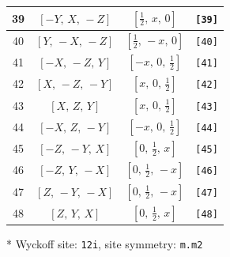 \documentclass[fleqn,8pt]{jsarticle}
\begin{document}
\begin{longtable}{cccc}
39 & $\left[ - Y,\, X,\, - Z \right]$ & $\left[ \frac{1}{2},\, x,\, 0 \right]$ & {\tt [39]} \\ \hline
40 & $\left[ Y,\, - X,\, - Z \right]$ & $\left[ \frac{1}{2},\, - x,\, 0 \right]$ & {\tt [40]} \\ \hline
41 & $\left[ - X,\, - Z,\, Y \right]$ & $\left[ - x,\, 0,\, \frac{1}{2} \right]$ & {\tt [41]} \\ \hline
42 & $\left[ X,\, - Z,\, - Y \right]$ & $\left[ x,\, 0,\, \frac{1}{2} \right]$ & {\tt [42]} \\ \hline
43 & $\left[ X,\, Z,\, Y \right]$ & $\left[ x,\, 0,\, \frac{1}{2} \right]$ & {\tt [43]} \\ \hline
44 & $\left[ - X,\, Z,\, - Y \right]$ & $\left[ - x,\, 0,\, \frac{1}{2} \right]$ & {\tt [44]} \\ \hline
45 & $\left[ - Z,\, - Y,\, X \right]$ & $\left[ 0,\, \frac{1}{2},\, x \right]$ & {\tt [45]} \\ \hline
46 & $\left[ - Z,\, Y,\, - X \right]$ & $\left[ 0,\, \frac{1}{2},\, - x \right]$ & {\tt [46]} \\ \hline
47 & $\left[ Z,\, - Y,\, - X \right]$ & $\left[ 0,\, \frac{1}{2},\, - x \right]$ & {\tt [47]} \\ \hline
48 & $\left[ Z,\, Y,\, X \right]$ & $\left[ 0,\, \frac{1}{2},\, x \right]$ & {\tt [48]} \\
\end{longtable}
* Wyckoff site: {\tt 12i}, site symmetry: {\tt m.m2}
\renewcommand{\arraystretch}{1.2}
\end{document}
